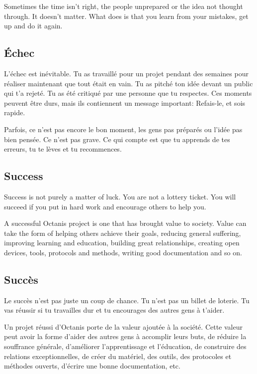 	Sometimes the time isn't right, the people unprepared or the idea not thought through. It doesn't matter. What does is that you learn from your mistakes, get up and do it again. 



\french
	\subsection{Échec}
	L'échec est inévitable. Tu as travaillé pour un projet pendant des semaines pour réaliser maintenant que tout était en vain. Tu as pitché ton idée devant un public qui t'a rejeté. Tu as été critiqué par une personne que tu respectes. 
	Ces moments peuvent être durs, mais ils contiennent un message important: Refais-le, et sois rapide.

	Parfois, ce n'est pas encore le bon moment, les gens pas préparés ou l'idée pas bien pensée. Ce n'est pas grave. Ce qui compte est que tu apprends de tes erreurs, tu te lèves et tu recommences. 

\english
	\subsection{Success}
	
	Success is not purely a matter of luck. You are not a lottery ticket. You will succeed if you put in hard work and encourage others to help you. 


	A successful Octanis project is one that has brought value to society. Value can take the form of helping others achieve their goals, reducing general suffering, improving learning and education, building great relationships, creating open devices, tools, protocols and methods, writing good documentation and so on.


\french
	\subsection{Succès}
	Le succès n'est pas juste un coup de chance. Tu n'est pas un billet de loterie. Tu vas réussir si tu travailles dur et tu encourages des autres gens à t'aider. 

	Un projet réussi d'Octanis porte de la valeur ajoutée à la société. Cette valeur peut avoir la forme d'aider des autres gens à accomplir leurs buts, de réduire la souffrance générale, d'améliorer l'apprentissage et l'éducation, de construire des relations exceptionnelles, de créer du matériel, des outils, des protocoles et méthodes ouverts, d'écrire une bonne documentation, etc. 


